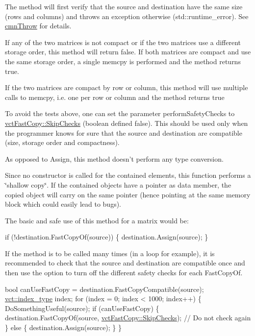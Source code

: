 \begin{DoxyItemize}
\item The method will first verify that the source and destination have the same size (rows and columns) and throws an exception otherwise ({\ttfamily std\-::runtime\-\_\-error}). See \hyperlink{cmn_throw_8h_a6fe29a0b6f112fe0032896bb904f8377}{cmn\-Throw} for details.
\item If any of the two matrices is not compact or if the two matrices use a different storage order, this method will return {\ttfamily false}. If both matrices are compact and use the same storage order, a single {\ttfamily memcpy} is performed and the method returns {\ttfamily true}.
\item If the two matrices are compact by row or column, this method will use multiple calls to {\ttfamily memcpy}, i.\-e. one per row or column and the method returns {\ttfamily true}
\item To avoid the tests above, one can set the parameter {\ttfamily perform\-Safety\-Checks} to {\ttfamily \hyperlink{classvct_fast_copy_a221c1b0117c8dcf51332ad84f4e0fda5}{vct\-Fast\-Copy\-::\-Skip\-Checks}} (boolean defined {\ttfamily false}). This should be used only when the programmer knows for sure that the source and destination are compatible (size, storage order and compactness).
\item As opposed to Assign, this method doesn't perform any type conversion.
\item Since no constructor is called for the contained elements, this function performs a \char`\"{}shallow copy\char`\"{}. If the contained objects have a pointer as data member, the copied object will carry on the same pointer (hence pointing at the same memory block which could easily lead to bugs).
\end{DoxyItemize}

The basic and safe use of this method for a matrix would be\-: 
\begin{DoxyCode}
\textcolor{keywordflow}{if} (!destination.FastCopyOf(source)) \{
    destination.Assign(source);
\}
\end{DoxyCode}


If the method is to be called many times (in a loop for example), it is recommended to check that the source and destination are compatible once and then use the option to turn off the different safety checks for each Fast\-Copy\-Of. 
\begin{DoxyCode}
\textcolor{keywordtype}{bool} canUseFastCopy = destination.FastCopyCompatible(source);
\hyperlink{namespacevct_a50405d87494dce1f22ee3930ca285ee9}{vct::index\_type} index;
\textcolor{keywordflow}{for} (index = 0; index < 1000; index++) \{
    DoSomethingUseful(source);
    \textcolor{keywordflow}{if} (canUseFastCopy) \{
        destination.FastCopyOf(source, \hyperlink{classvct_fast_copy_a221c1b0117c8dcf51332ad84f4e0fda5}{vctFastCopy::SkipChecks}); \textcolor{comment}{// Do not check
       again}
    \} \textcolor{keywordflow}{else} \{
        destination.Assign(source);
    \}
\}
\end{DoxyCode}


